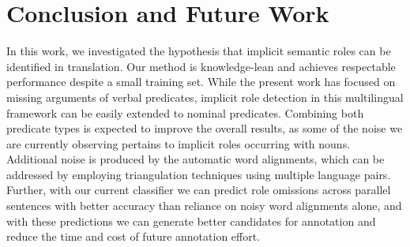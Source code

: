 \documentclass[11pt]{article}
\begin{document}
\section{Conclusion and Future Work}
In this work, we investigated the hypothesis that implicit semantic roles can be identified in translation. Our method is knowledge-lean and achieves respectable performance despite a small training set. While the present work has focused on missing arguments of verbal predicates, implicit role detection in this multilingual framework can be easily extended to nominal predicates.
Combining both predicate types is expected to improve the overall results, as some of the noise we are currently observing pertains to implicit roles occurring with nouns.
Additional noise is produced by the automatic word alignments, which can be addressed by employing triangulation techniques using multiple language pairs. Further, with our current classifier we can predict role omissions across parallel sentences with better accuracy than reliance on noisy word alignments alone, and with these predictions we can generate better candidates for annotation and reduce the time and cost of future annotation effort.

\end{document}
